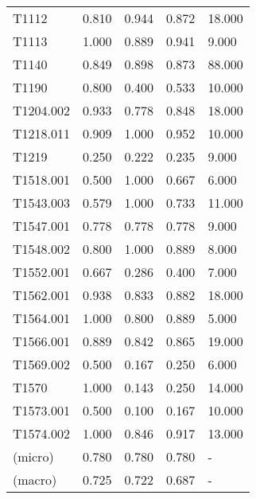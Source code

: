 \begin{tabular}{lrrrl}
    T1112     & 0.810 & 0.944 & 0.872 & 18.000  \\
    T1113     & 1.000 & 0.889 & 0.941 & 9.000   \\
    T1140     & 0.849 & 0.898 & 0.873 & 88.000  \\
    T1190     & 0.800 & 0.400 & 0.533 & 10.000  \\
    T1204.002 & 0.933 & 0.778 & 0.848 & 18.000  \\
    T1218.011 & 0.909 & 1.000 & 0.952 & 10.000  \\
    T1219     & 0.250 & 0.222 & 0.235 & 9.000   \\
    T1518.001 & 0.500 & 1.000 & 0.667 & 6.000   \\
    T1543.003 & 0.579 & 1.000 & 0.733 & 11.000  \\
    T1547.001 & 0.778 & 0.778 & 0.778 & 9.000   \\
    T1548.002 & 0.800 & 1.000 & 0.889 & 8.000   \\
    T1552.001 & 0.667 & 0.286 & 0.400 & 7.000   \\
    T1562.001 & 0.938 & 0.833 & 0.882 & 18.000  \\
    T1564.001 & 1.000 & 0.800 & 0.889 & 5.000   \\
    T1566.001 & 0.889 & 0.842 & 0.865 & 19.000  \\
    T1569.002 & 0.500 & 0.167 & 0.250 & 6.000   \\
    T1570     & 1.000 & 0.143 & 0.250 & 14.000  \\
    T1573.001 & 0.500 & 0.100 & 0.167 & 10.000  \\
    T1574.002 & 1.000 & 0.846 & 0.917 & 13.000 \\
    (micro)   & 0.780 & 0.780 & 0.780 & - \\
    (macro)   & 0.725 & 0.722 & 0.687 & -       \\
    \bottomrule
\end{tabular}
